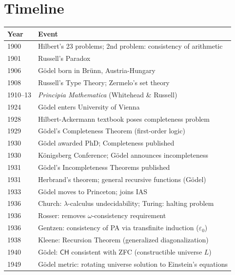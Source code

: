 \section{Timeline}
\label{sec:godel:timeline}

\begin{tabularx}{\linewidth}{|l|X|}
\hline
\textbf{Year} & \textbf{Event} \\ \hline
1900 & Hilbert's 23 problems; 2nd problem: consistency of arithmetic \\ \hline
1901 & Russell's Paradox \\ \hline
1906 & Gödel born in Brünn, Austria-Hungary \\ \hline
1908 & Russell's Type Theory; Zermelo's set theory \\ \hline
1910--13 & \emph{Principia Mathematica} (Whitehead \& Russell) \\ \hline
1924 & Gödel enters University of Vienna \\ \hline
1928 & Hilbert-Ackermann textbook poses completeness problem \\ \hline
1929 & Gödel's Completeness Theorem (first-order logic) \\ \hline
1930 & Gödel awarded PhD; Completeness published \\ \hline
1930 & Königsberg Conference; Gödel announces incompleteness \\ \hline
1931 & Gödel's Incompleteness Theorems published \\ \hline
1931 & Herbrand's theorem; general recursive functions (Gödel) \\ \hline
1933 & Gödel moves to Princeton; joins IAS \\ \hline
1936 & Church: $\lambda$-calculus undecidability; Turing: halting problem \\ \hline
1936 & Rosser: removes $\omega$-consistency requirement \\ \hline
1936 & Gentzen: consistency of PA via transfinite induction ($\varepsilon_0$) \\ \hline
1938 & Kleene: Recursion Theorem (generalized diagonalization) \\ \hline
1940 & Gödel: $\mathsf{CH}$ consistent with ZFC (constructible universe $L$) \\ \hline
1949 & Gödel metric: rotating universe solution to Einstein's equations \\ \hline

\end{tabularx}
